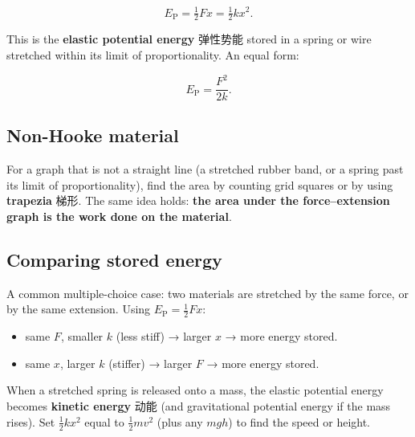 \documentclass[11pt]{article}
\begin{document}
\[
E_{\text{P}} = \tfrac{1}{2} F x = \tfrac{1}{2} k x^{2}.
\]

This is the \textbf{elastic potential energy} 弹性势能 stored in a spring or wire stretched within its limit of proportionality. An equal form:

\[
E_{\text{P}} = \frac{F^{2}}{2k}.
\]

\subsection*{Non-Hooke material}

For a graph that is not a straight line (a stretched rubber band, or a spring past its limit of proportionality), find the area by counting grid squares or by using \textbf{trapezia} 梯形. The same idea holds: \textbf{the area under the force–extension graph is the work done on the material}.

\subsection*{Comparing stored energy}

A common multiple-choice case: two materials are stretched by the same force, or by the same extension. Using $E_{\text{P}} = \tfrac{1}{2} F x$:

\begin{itemize}
\item same $F$, smaller $k$ (less stiff) → larger $x$ → more energy stored.

\item same $x$, larger $k$ (stiffer) → larger $F$ → more energy stored.

\end{itemize}

When a stretched spring is released onto a mass, the elastic potential energy becomes \textbf{kinetic energy} 动能 (and gravitational potential energy if the mass rises). Set $\tfrac{1}{2} k x^{2}$ equal to $\tfrac{1}{2} m v^{2}$ (plus any $mgh$) to find the speed or height.
\end{document}
